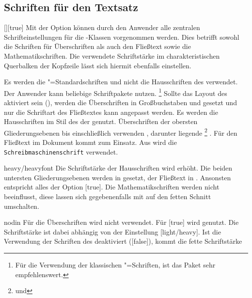 \begin{Declaration*}{}
\begin{Declaration*}{}
\begin{Declaration*}{}
\subsection{Schriften für den Textsatz}
\label{sec:text}%
%
%
\begin{Declaration}{[\PSet]}[true]%
\printdeclarationlist%
%
Mit der Option  können durch den Anwender alle zentralen 
Schrifteinstellungen für die \TUDScript-Klassen vorgenommen werden. Dies 
betrifft sowohl die Schriften für Überschriften als auch den Fließtext sowie 
die Mathematikschriften. Die verwendete Schriftstärke im charakteristischen 
Querbalken der Kopfzeile lässt sich hiermit ebenfalls einstellen.
%
\begin{values}
\itemfalse
  Es werden die "=Standardschriften und nicht die Hausschriften 
  des \CDs verwendet. Der Anwender kann beliebige Schriftpakete nutzen.%
  \footnote{%
    Für die Verwendung der klassischen "=Schriften, ist das Paket 
     sehr empfehlenswert.%
  }
  Sollte das Layout des \CDs aktiviert sein (), werden die 
  Überschriften in Großbuchstaben und \DIN gesetzt und nur die Schriftart des 
  Fließtextes kann angepasst werden.
  Es werden die Hausschriften im Stil des \CDs der \TnUD genutzt. Überschriften 
  der obersten Gliederungsebenen bis einschließlich  
  verwenden \DIN, darunter liegende%
  \footnote{ und } 
  . Für den Fließtext im Dokument kommt 
   zum Einsatz. Aus  wird die
  \texttt{Schreibmaschinenschrift} verwendet.
\item[heavy/heavyfont]
  Die Schriftstärke der Hausschriften wird erhöht. Die beiden untersten 
  Gliederungsebenen werden in  gesetzt, der Fließtext 
  in . Ansonsten entspricht alles der Option 
  [true]. Die Mathematikschriften werden nicht beeinflusst, 
  diese lassen sich gegebenenfalls mit  auf den fetten Schnitt 
  umschalten.
\item[nodin]
  Für die Überschriften wird \DIN nicht verwendet. Für [true] 
  wird \Univers genutzt. Die Schriftstärke ist dabei abhängig von der   
  Einstellung [light/heavy]. Ist die Verwendung der Schriften 
  des \CDs deaktiviert ([false]), kommt die fette Schriftstärke 

\end{values}
\end{Declaration}
\end{Declaration*}
\end{Declaration*}
\end{Declaration*}
